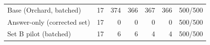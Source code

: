 \begin{table}[t]
{\begin{tabular}{lrrrrrr}
Base (Orchard, batched) & 17 & 374 & 366 & 367 & 366 & 500/500 \\
Answer-only (corrected set) & 17 & 0 & 0 & 0 & 0 & 500/500 \\
Set B pilot (batched) & 17 & 6 & 6 & 4 & 4 & 500/500 \\

\end{tabular}}
\end{table}
